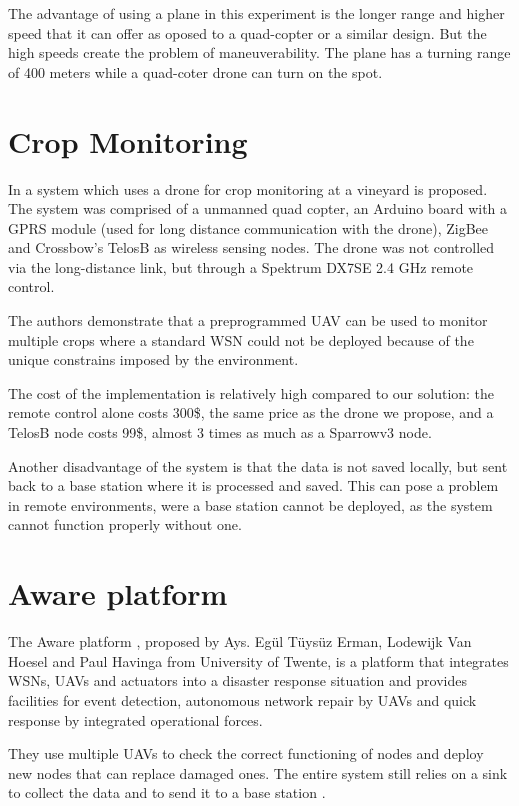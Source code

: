 The advantage of using a plane in this experiment is the longer range and higher speed that it can offer as oposed to a quad-copter or a similar design.  But the high speeds create the problem of maneuverability. The plane has a turning range of 400 meters while a quad-coter drone can turn on the spot.

\section{Crop Monitoring}

In \cite{valente2011air} a system which uses a drone for crop monitoring at a vineyard is proposed. The system was comprised of a unmanned quad copter, an Arduino board with a GPRS module (used for long distance communication with  the drone), ZigBee and Crossbow’s TelosB as wireless sensing nodes. The drone was not controlled via the long-distance link, but through a Spektrum DX7SE 2.4 GHz remote control.

The authors demonstrate that a preprogrammed UAV can be used to monitor multiple crops where a standard WSN could not be deployed because of the unique constrains imposed by the environment.

The cost of the implementation is relatively high compared to our solution: the remote control alone costs 300\$, the same price as the drone we propose, and a TelosB node costs 99\$, almost 3 times as much as a Sparrowv3 node.

Another disadvantage of the system is that the data is not saved locally, but sent back to a base station where it is processed and saved. This can pose a problem in remote environments, were a base station cannot be deployed, as the system cannot function properly without one.

\section{Aware platform}

The Aware platform \cite{ollero2007aware}, proposed by Ays. Egül Tüysüz Erman, Lodewijk Van Hoesel and Paul Havinga from University of Twente, is a platform that integrates WSNs, UAVs and actuators into a disaster response situation and provides facilities for event detection, autonomous network repair by UAVs and quick response by integrated operational forces.

They use multiple UAVs to check the correct functioning of nodes and deploy new nodes that can replace damaged ones. The entire system still relies on a sink to collect the data and to send it to a base station \cite{erman2008enabling}.
